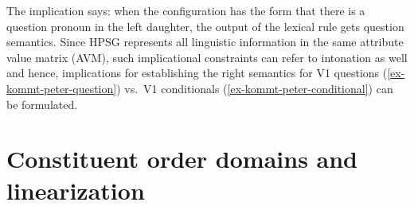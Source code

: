 \documentclass[output=paper
                ,modfonts
                ,nonflat
	        ,collection
	        ,collectionchapter
	        ,collectiontoclongg
 	        ,biblatex
                ,babelshorthands
                ,newtxmath
                ,draftmode
                ,colorlinks, citecolor=brown
]{./langsci/langscibook}
\begin{document}
The implication says: when the configuration has the form that there is a question pronoun in the
left daughter, the output of the lexical rule gets question semantics. Since HPSG represents all
linguistic information in the same attribute value matrix (AVM), such implicational constraints can refer to intonation as
well and hence, implications for establishing the right semantics for V1 questions (\ref{ex-kommt-peter-question}) vs.\ V1
conditionals (\ref{ex-kommt-peter-conditional}) can be formulated.



\section{Constituent order domains and linearization}
\label{sec-domains}
\end{document}
